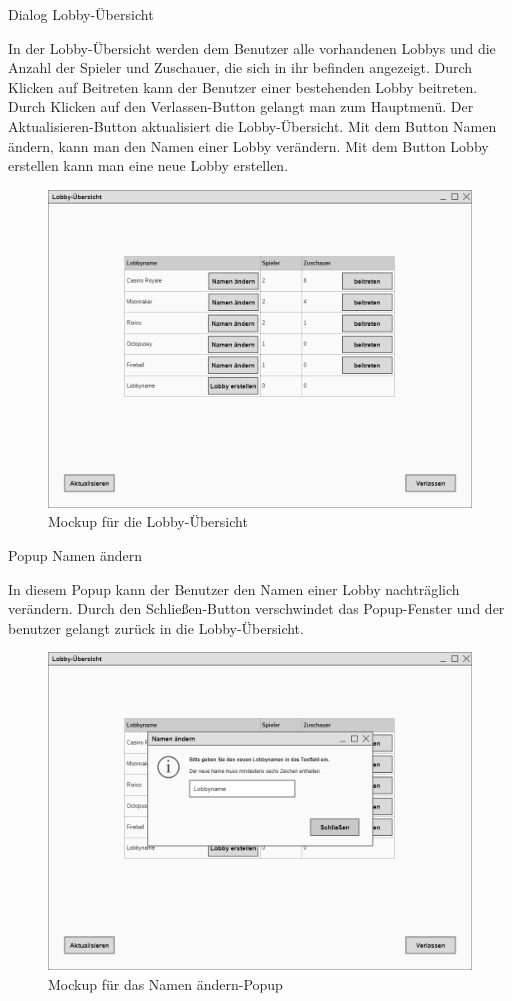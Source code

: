Dialog \glqq{}Lobby-Übersicht\grqq{}

In der Lobby-Übersicht werden dem Benutzer alle vorhandenen Lobbys und die Anzahl der Spieler und Zuschauer, die sich in ihr befinden angezeigt. Durch Klicken auf Beitreten kann der Benutzer einer bestehenden Lobby beitreten. Durch Klicken auf den Verlassen-Button gelangt man zum Hauptmenü. Der Aktualisieren-Button aktualisiert die Lobby-Übersicht. Mit dem Button Namen ändern, kann man den Namen einer Lobby verändern. Mit dem Button Lobby erstellen kann man eine neue Lobby erstellen.

\begin{figure}[H]
  \centering
  \includegraphics[width=\textwidth]{Meilenstein03/Lobby-Uebersicht_Mockup.png}
  \caption{Mockup für die Lobby-Übersicht}
\end{figure}

Popup \glqq{}Namen ändern\grqq{}

In diesem Popup kann der Benutzer den Namen einer Lobby nachträglich verändern. Durch den Schließen-Button verschwindet das Popup-Fenster und der benutzer gelangt zurück in die Lobby-Übersicht.

\begin{figure}[H]
  \centering
  \includegraphics[width=\textwidth]{Meilenstein03/NamenAendern_Mockup.png}
  \caption{Mockup für das Namen ändern-Popup}
\end{figure}

